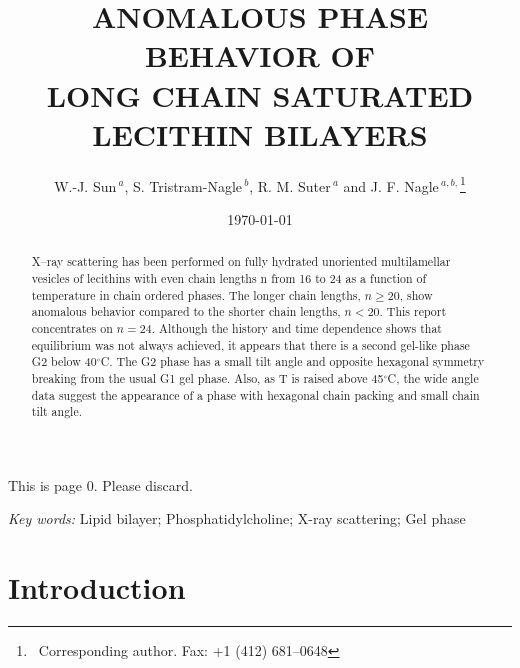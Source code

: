 
%
%


\begin{titlepage}
\title{ANOMALOUS PHASE BEHAVIOR OF\protect\\
LONG CHAIN SATURATED LECITHIN BILAYERS
}
\author{W.-J. Sun$^{\ a}$, S. Tristram-Nagle$^{\ b}$, R. M. Suter$^{\ a}$ 
and J. F. Nagle$^{\ a,b,}$\footnote{\ Corresponding author. Fax: +1 (412) 
681--0648}} 
\address{$^{\ a}$Departments of Physics and $^{\ b}$Biological Sciences,
\protect\\
 Carnegie Mellon University , Pittsburgh, PA 15213
}
\date{\today}
This is page 0. Please discard.
\maketitle
\vspace{360pt}
\begin{flushleft}
\textit{Key words:} Lipid bilayer; Phosphatidylcholine; X-ray scattering;
Gel phase
\end{flushleft}
\end{titlepage}

\begin{abstract}
X--ray scattering has been performed on fully hydrated unoriented
multilamellar vesicles of lecithins with even chain lengths n from 16 to 24
as a function of temperature in chain ordered phases. The longer chain lengths, 
$n \geq 20$, show anomalous behavior compared to the shorter chain lengths,
$n< 20$.  This report concentrates on $n = 24$.  Although the history
and time dependence shows that equilibrium was not always achieved, it
appears that there is a second gel-like phase G2 below 40$^{\circ}$C.  
The G2 phase has a small tilt angle and opposite hexagonal symmetry breaking 
from the usual G1 gel phase. Also, as T is raised above 45$^{\circ}$C, the 
wide angle data suggest the appearance of a phase with hexagonal chain packing 
and small chain tilt angle.
\end{abstract}
\newpage

\section{Introduction}

